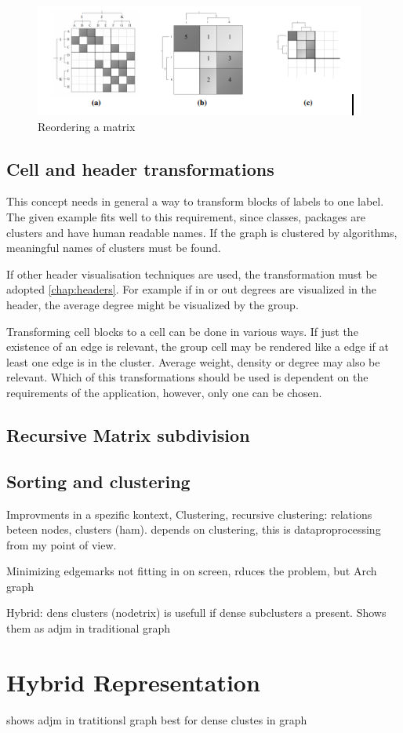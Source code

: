 \begin{figure}[h]
\centering
\includegraphics{images/matrixzoom_transform}
\caption{Reordering a matrix\label{fig:reorder}}
\end{figure}




\subsection{Cell and header transformations}   
This concept needs in general a way to transform blocks of labels to one label. The given example fits well to this requirement, since classes, packages are clusters and have human readable names. If the graph is clustered by algorithms, meaningful names of clusters must be found.

If other header visualisation techniques are used, the transformation must be adopted \ref{chap:headers}. For example if in or out degrees are visualized in the header, the average degree might be visualized by the group.

Transforming cell blocks to a cell can be done in various ways. If just the existence of an edge is relevant, the group cell may be rendered like a edge if at least one edge is in the cluster. Average weight, density or degree may also be relevant. Which of this transformations should be used is dependent on the requirements of the application, however, only one can be chosen.










\subsection{Recursive Matrix subdivision}   
\subsection{Sorting and clustering}   

Improvments in a spezific kontext, 
Clustering, recursive clustering: relations beteen nodes, clusters (ham). depends on clustering, this is dataproprocessing from my point of view.

Minimizing edgemarks not fitting in on screen, rduces the problem, but 
Arch graph


Hybrid: dens clusters (nodetrix) is usefull if dense subclusters a present. Shows them as adjm in traditional graph


\section{Hybrid Representation}
shows adjm in tratitionsl graph
best for dense clustes in graph